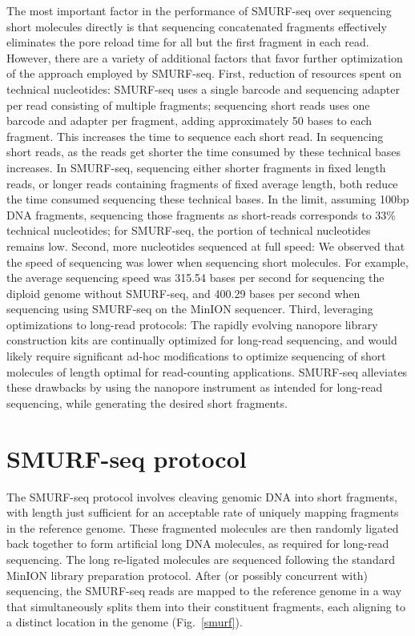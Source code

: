 The most important factor in the performance of SMURF-seq over
sequencing short molecules directly is that sequencing concatenated
fragments effectively eliminates the pore reload time for all but the
first fragment in each read. However, there are a variety of additional
factors that favor further optimization of the approach employed by
SMURF-seq.
First, reduction of resources spent on technical nucleotides: SMURF-seq
uses a single barcode and sequencing adapter per read consisting of
multiple fragments; sequencing short reads uses one barcode and adapter
per fragment, adding approximately 50 bases to each fragment. This
increases the time to sequence each short read. In sequencing short
reads, as the reads get shorter the time consumed by these technical
bases increases. In SMURF-seq, sequencing either shorter fragments in
fixed length reads, or longer reads containing fragments of fixed
average length, both reduce the time consumed sequencing these technical
bases.
In the limit, assuming 100bp DNA fragments, sequencing those fragments
as short-reads corresponds to 33\% technical nucleotides; for SMURF-seq,
the portion of technical nucleotides remains low.
Second, more nucleotides sequenced at full speed: We observed that the
speed of sequencing was lower when sequencing short molecules. For
example, the average sequencing speed was 315.54 bases per second for
sequencing the diploid genome without SMURF-seq, and 400.29 bases per
second when sequencing using SMURF-seq on the MinION sequencer.
Third, leveraging optimizations to long-read protocols: The rapidly
evolving nanopore library construction kits are continually optimized
for long-read sequencing, and would likely require significant ad-hoc
modifications to optimize sequencing of short molecules of length
optimal for read-counting applications. SMURF-seq alleviates these
drawbacks by using the nanopore instrument as intended for long-read
sequencing, while generating the desired short fragments.



\section{SMURF-seq protocol}
The SMURF-seq protocol involves cleaving genomic DNA into short
fragments, with length just sufficient for an acceptable rate of
uniquely mapping fragments in the reference genome.  These fragmented
molecules are then randomly ligated back together to form artificial
long DNA molecules, as required for long-read sequencing. The long
re-ligated molecules are sequenced following the standard MinION library
preparation protocol. After (or possibly concurrent with) sequencing,
the SMURF-seq reads are mapped to the reference genome in a way that
simultaneously splits them into their constituent fragments, each
aligning to a distinct location in the genome (Fig.~\ref{smurf}).

